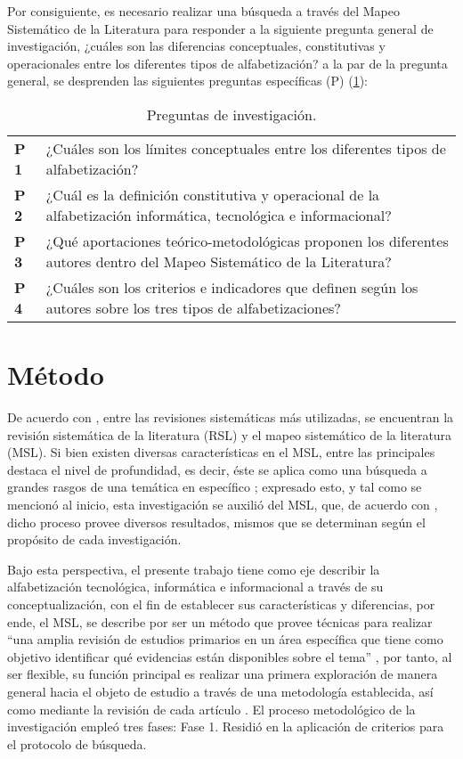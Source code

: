 \documentclass{textolivre}
\begin{document}
Por consiguiente, es necesario realizar una búsqueda a través del Mapeo Sistemático de la Literatura para responder a la siguiente pregunta general de investigación, ¿cuáles son las diferencias conceptuales, constitutivas y operacionales entre los diferentes tipos de alfabetización? a la par de la pregunta general, se desprenden las siguientes preguntas específicas (P) (\cref{tbl03}):

\begin{table}[htbp]
\caption{Preguntas de investigación.}
\label{tbl03}
\centering
\begin{tabular}{lp{12cm}}
\toprule
\textbf{P 1} & ¿Cuáles son los límites conceptuales entre los diferentes tipos de alfabetización? \\ 
\textbf{P 2} & ¿Cuál es la definición constitutiva y operacional de la alfabetización informática, tecnológica e informacional? \\ 
\textbf{P 3} & ¿Qué aportaciones teórico-metodológicas proponen los diferentes autores dentro del Mapeo Sistemático de la Literatura? \\ 
\textbf{P 4} & ¿Cuáles son los criterios e indicadores que definen según los autores sobre los tres tipos de alfabetizaciones? \\
\bottomrule
\end{tabular}
\end{table}

\section{Método}\label{sec-metodo}
De acuerdo con \textcite{garcia-penalvo_revisiones_2019}, entre las revisiones sistemáticas más utilizadas, se encuentran la revisión sistemática de la literatura (RSL) y el mapeo sistemático de la literatura (MSL). Si bien existen diversas características en el MSL, entre las principales destaca el nivel de profundidad, es decir, éste se aplica como una búsqueda a grandes rasgos de una temática en específico \cite{cascade_project_mapping_2012}; expresado esto, y tal como se mencionó al inicio, esta investigación se auxilió del MSL, que, de acuerdo con \textcite{garcia-holgado_tecnicas_2018}, dicho proceso provee diversos resultados, mismos que se determinan según el propósito de cada investigación.

Bajo esta perspectiva, el presente trabajo tiene como eje describir la alfabetización tecnológica, informática e informacional a través de su conceptualización, con el fin de establecer sus características y diferencias, por ende, el MSL, se describe por ser un método que provee técnicas para realizar “una amplia revisión de estudios primarios en un área específica que tiene como objetivo identificar qué evidencias están disponibles sobre el tema” \cite[s.p.]{garcia-penalvo_revisiones_2019}, por tanto, al ser flexible, su función principal es realizar una primera exploración de manera general hacia el objeto de estudio a través de una metodología establecida, así como mediante la revisión de cada artículo \cite{cruz-benito__systematic_2016}.
El proceso metodológico de la investigación empleó tres fases:
Fase 1. Residió en la aplicación de criterios para el protocolo de búsqueda.
\end{document}
